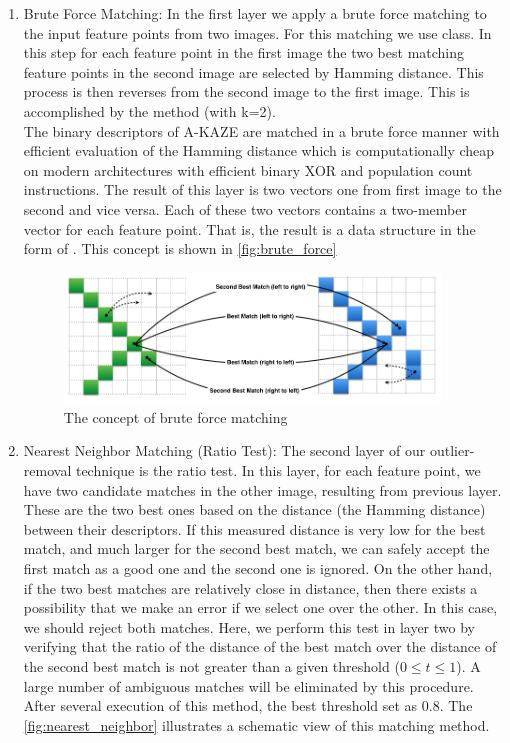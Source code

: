 \begin {enumerate}
  \item Brute Force Matching: In the first layer we apply a brute force matching to the input feature points from two images. For this matching we use  class. In this step for each feature point in the first image the two best matching feature points in the second image are selected by Hamming distance. This process is then reverses from the second image to the first image. This is accomplished by the  method (with k=2).\\
  The binary descriptors of A-KAZE are matched in a brute force manner with efficient evaluation of the Hamming distance which is computationally cheap on modern architectures with efficient binary XOR and population count instructions.
  The result of this layer is two vectors one from first image to the second and vice versa. Each of these two vectors contains a two-member vector for each feature point. That is, the result is a data structure in the form of . This concept is shown in \autoref{fig:brute_force}

  \begin{figure}[H]
  \centering
  \includegraphics[width=100mm]{figures/brute_force}
  \caption{The concept of brute force matching}\label{fig:brute_force}
  \end{figure}
  \item Nearest Neighbor Matching (Ratio Test): The second layer of our outlier-removal technique is the ratio test. In this layer, for each feature point, we have two candidate matches in the other image, resulting from previous layer. These are the two best ones based on the distance (the Hamming distance) between their descriptors. If this measured distance is very low for the best match, and much larger for the second best match, we can safely accept the first match as a good one and the second one is ignored. On the other hand, if the two best matches are relatively close in distance, then there exists a possibility that we make an error if we select one over the other. In this case, we should reject both matches. Here, we perform this test in layer two by verifying that the ratio of the distance of the best match over the distance of the second best match is not greater than a given threshold ($0 \leq t \leq1$). A large number of ambiguous matches will be eliminated by this procedure. After several execution of this method, the best threshold set as 0.8. The \autoref{fig:nearest_neighbor} illustrates a schematic view of this matching method.


\end{enumerate}
